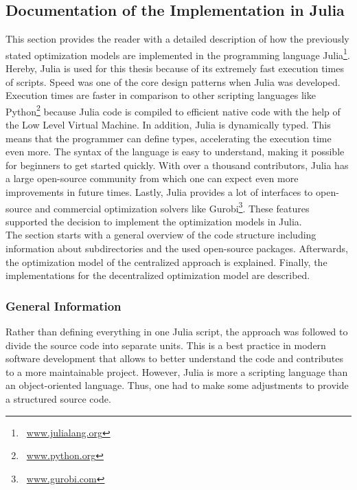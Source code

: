 \subsection{Documentation of the Implementation in Julia}

This section provides the reader with a detailed description of how the previously stated optimization models are implemented in the programming language Julia\footnote{~\url{www.julialang.org}}. Hereby, Julia is used for this thesis because of its extremely fast execution times of scripts. Speed was one of the core design patterns when Julia was developed. Execution times are faster in comparison to other scripting languages like Python\footnote{~\url{www.python.org}} because Julia code is compiled to efficient native code with the help of the Low Level Virtual Machine. In addition, Julia is dynamically typed. This means that the programmer can define types, accelerating the execution time even more. The syntax of the language is easy to understand, making it possible for beginners to get started quickly. With over a thousand contributors, Julia has a large open-source community from which one can expect even more improvements in future times. Lastly, Julia provides a lot of interfaces to open-source and commercial optimization solvers like Gurobi\footnote{~\url{www.gurobi.com}}. These features supported the decision to implement the optimization models in Julia. \\

The section starts with a general overview of the code structure including information about subdirectories and the used open-source packages. Afterwards, the optimization model of the centralized approach is explained. Finally, the implementations for the decentralized optimization model are described.

\subsubsection{General Information}

Rather than defining everything in one Julia script, the approach was followed to divide the source code into separate units. This is a best practice in modern software development that allows to better understand the code and contributes to a more maintainable project. However, Julia is more a scripting language than an object-oriented language. Thus, one had to make some adjustments to provide a structured source code.\\ 

